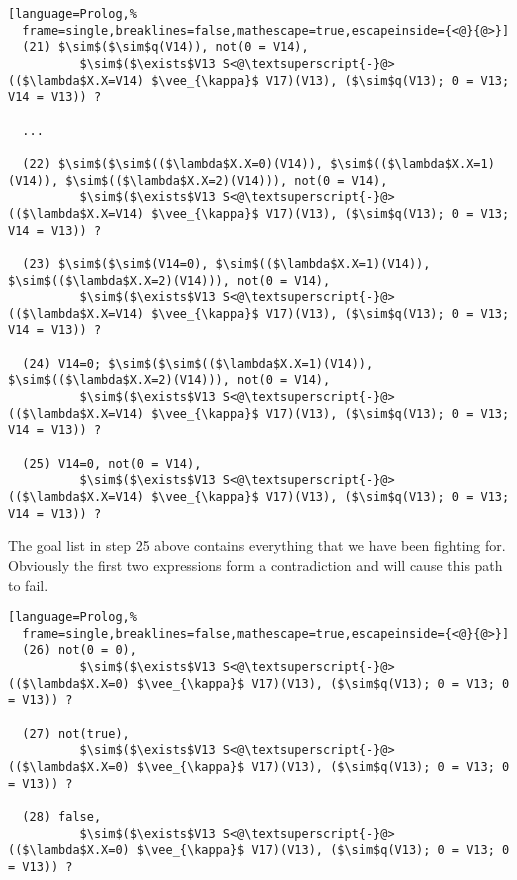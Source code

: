 \documentclass[inscr,ack,preface]{dithesis}
\theoremstyle{definition}
\begin{document}
\begin{lstlisting}[language=Prolog,%
  frame=single,breaklines=false,mathescape=true,escapeinside={<@}{@>}]
  (21) $\sim$($\sim$q(V14)), not(0 = V14),
          $\sim$($\exists$V13 S<@\textsuperscript{-}@>(($\lambda$X.X=V14) $\vee_{\kappa}$ V17)(V13), ($\sim$q(V13); 0 = V13; V14 = V13)) ?

  ...

  (22) $\sim$($\sim$(($\lambda$X.X=0)(V14)), $\sim$(($\lambda$X.X=1)(V14)), $\sim$(($\lambda$X.X=2)(V14))), not(0 = V14),
          $\sim$($\exists$V13 S<@\textsuperscript{-}@>(($\lambda$X.X=V14) $\vee_{\kappa}$ V17)(V13), ($\sim$q(V13); 0 = V13; V14 = V13)) ?

  (23) $\sim$($\sim$(V14=0), $\sim$(($\lambda$X.X=1)(V14)), $\sim$(($\lambda$X.X=2)(V14))), not(0 = V14),
          $\sim$($\exists$V13 S<@\textsuperscript{-}@>(($\lambda$X.X=V14) $\vee_{\kappa}$ V17)(V13), ($\sim$q(V13); 0 = V13; V14 = V13)) ?

  (24) V14=0; $\sim$($\sim$(($\lambda$X.X=1)(V14)), $\sim$(($\lambda$X.X=2)(V14))), not(0 = V14),
          $\sim$($\exists$V13 S<@\textsuperscript{-}@>(($\lambda$X.X=V14) $\vee_{\kappa}$ V17)(V13), ($\sim$q(V13); 0 = V13; V14 = V13)) ?

  (25) V14=0, not(0 = V14),
          $\sim$($\exists$V13 S<@\textsuperscript{-}@>(($\lambda$X.X=V14) $\vee_{\kappa}$ V17)(V13), ($\sim$q(V13); 0 = V13; V14 = V13)) ?
\end{lstlisting}

The goal list in step 25 above contains everything that we have been fighting for. Obviously the first two expressions form a contradiction and will cause this path to fail.
\begin{lstlisting}[language=Prolog,%
  frame=single,breaklines=false,mathescape=true,escapeinside={<@}{@>}]
  (26) not(0 = 0),
          $\sim$($\exists$V13 S<@\textsuperscript{-}@>(($\lambda$X.X=0) $\vee_{\kappa}$ V17)(V13), ($\sim$q(V13); 0 = V13; 0 = V13)) ?

  (27) not(true),
          $\sim$($\exists$V13 S<@\textsuperscript{-}@>(($\lambda$X.X=0) $\vee_{\kappa}$ V17)(V13), ($\sim$q(V13); 0 = V13; 0 = V13)) ?

  (28) false,
          $\sim$($\exists$V13 S<@\textsuperscript{-}@>(($\lambda$X.X=0) $\vee_{\kappa}$ V17)(V13), ($\sim$q(V13); 0 = V13; 0 = V13)) ?
\end{lstlisting}
\end{document}
